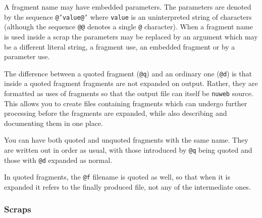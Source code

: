 \documentclass[a4paper]{report}
\begin{document}
A fragment name may have embedded parameters. The parameters are
denoted by the sequence \texttt{@'value@'} where \texttt{value} is
an uninterpreted string of characters (although the sequence
\texttt{@@} denotes a single \texttt{@} character). When a fragment
name is used inside a scrap the parameters may be replaced by an
argument which may be a different literal string, a fragment use, an
embedded fragment or by a parameter use.

The difference between a quoted fragment (\texttt{@q}) and an
ordinary one (\texttt{@d}) is that inside a quoted fragment fragments
are not expanded on output. Rather, they are formatted as uses of
fragments so that the output file can itself be \texttt{nuweb}
source. This allows you to create files containing fragments which can
undergo further processing before the fragments are expanded, while
also describing and documenting them in one place.

You can have both quoted and unquoted fragments with the same
name. They are written out in order as usual, with those introduced by
\texttt{@q} being quoted and those with \texttt{@d} expanded as
normal.

In quoted fragments, the \texttt{@f} filename is quoted as well, so that
when it is expanded it refers to the finally produced file, not
any of the intermediate ones.

\subsubsection{Scraps}
\end{document}
